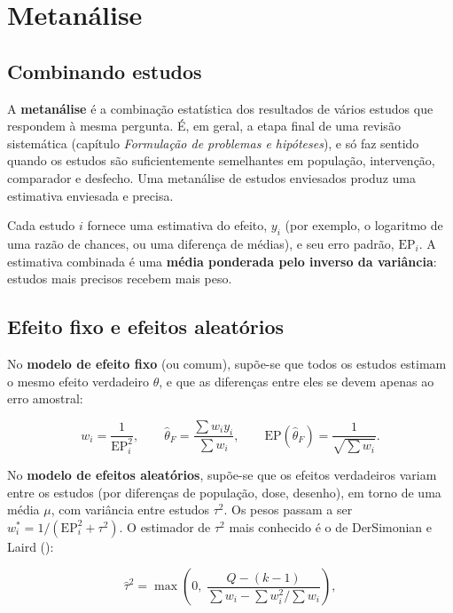 \documentclass[
]{book}
\begin{document}
\section{Metanálise}\label{metanuxe1lise}

\subsection{Combinando estudos}\label{combinando-estudos}

A \textbf{metanálise} é a combinação estatística dos resultados de vários estudos que respondem à mesma pergunta. É, em geral, a etapa final de uma revisão sistemática (capítulo \emph{Formulação de problemas e hipóteses}), e só faz sentido quando os estudos são suficientemente semelhantes em população, intervenção, comparador e desfecho. Uma metanálise de estudos enviesados produz uma estimativa enviesada e precisa.

Cada estudo \(i\) fornece uma estimativa do efeito, \(y_i\) (por exemplo, o logaritmo de uma razão de chances, ou uma diferença de médias), e seu erro padrão, \(\text{EP}_i\). A estimativa combinada é uma \textbf{média ponderada pelo inverso da variância}: estudos mais precisos recebem mais peso.

\subsection{Efeito fixo e efeitos aleatórios}\label{efeito-fixo-e-efeitos-aleatuxf3rios}

No \textbf{modelo de efeito fixo} (ou comum), supõe-se que todos os estudos estimam o mesmo efeito verdadeiro \(\theta\), e que as diferenças entre eles se devem apenas ao erro amostral:

\[
w_i = \frac{1}{\text{EP}_i^2}, \qquad \hat{\theta}_F = \frac{\sum w_i y_i}{\sum w_i}, \qquad \text{EP}(\hat{\theta}_F) = \frac{1}{\sqrt{\sum w_i}} .
\]

No \textbf{modelo de efeitos aleatórios}, supõe-se que os efeitos verdadeiros variam entre os estudos (por diferenças de população, dose, desenho), em torno de uma média \(\mu\), com variância entre estudos \(\tau^2\). Os pesos passam a ser \(w_i^* = 1/(\text{EP}_i^2 + \tau^2)\). O estimador de \(\tau^2\) mais conhecido é o de DerSimonian e Laird ():

\[
\hat{\tau}^2 = \max\left(0,\; \frac{Q - (k - 1)}{\sum w_i - \sum w_i^2 / \sum w_i}\right),
\]
\end{document}
